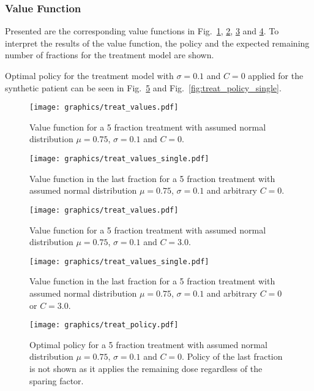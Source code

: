\documentclass[\relativeRoot/ada.tex]{subfiles}
\begin{document}
\subsubsection{Value Function}
Presented are the corresponding value functions in Fig.~\ref{fig:treat_values}, \ref{fig:treat_values_single}, \ref{fig:treat_values_c} and \ref{fig:treat_values_single_c}. To interpret the results of the value function, the policy and the expected remaining number of fractions for the treatment model are shown.

Optimal policy for the treatment model with $\sigma=0.1$ and $C=0$ applied for the synthetic patient can be seen in Fig.~\ref{fig:treat_policy} and Fig.~\ref{fig:treat_policy_single}.

\begin{figure}[!htb]
    \centering
    \texttt{[image: graphics/treat\_values.pdf]}
    \caption{Value function for a 5 fraction treatment with assumed normal distribution $\mu=0.75$, $\sigma=0.1$ and $C=0$.}
    \label{fig:treat_values}
\end{figure}

\begin{figure}[!htb]
    \centering
    \texttt{[image: graphics/treat\_values\_single.pdf]}
    \caption{Value function in the last fraction for a 5 fraction treatment with assumed normal distribution $\mu=0.75$, $\sigma=0.1$ and arbitrary $C=0$.}
    \label{fig:treat_values_single}
\end{figure}

\begin{figure}[!htb]
    \centering
    \texttt{[image: graphics/treat\_values.pdf]}
    \caption{Value function for a 5 fraction treatment with assumed normal distribution $\mu=0.75$, $\sigma=0.1$ and $C=3.0$.}
    \label{fig:treat_values_c}
\end{figure}

\begin{figure}[!htb]
    \centering
    \texttt{[image: graphics/treat\_values\_single.pdf]}
    \caption{Value function in the last fraction for a 5 fraction treatment with assumed normal distribution $\mu=0.75$, $\sigma=0.1$ and arbitrary $C=0$ or $C=3.0$.}
    \label{fig:treat_values_single_c}
\end{figure}

\begin{figure}[!htb]
    \centering
    \texttt{[image: graphics/treat\_policy.pdf]}
    \caption{Optimal policy for a 5 fraction treatment with assumed normal distribution $\mu=0.75$, $\sigma=0.1$ and $C=0$. Policy of the last fraction is not shown as it applies the remaining dose regardless of the sparing factor.}
    \label{fig:treat_policy}
\end{figure}
\end{document}
